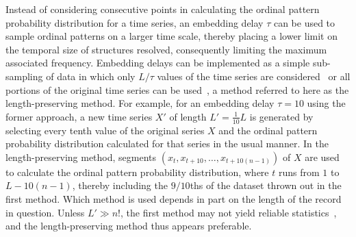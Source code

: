 \documentclass[aps,prx,twocolumn,secnumarabic,nobalancelastpage,amsmath,amssymb,
nofootinbib]{revtex4-1}
\begin{document}
Instead of considering consecutive points in calculating the ordinal pattern probability distribution for a time series, an embedding delay $\tau$ can be used to sample ordinal patterns on a larger time scale, thereby placing a lower limit on the temporal size of structures resolved, consequently limiting the maximum associated frequency. Embedding delays can be implemented as a simple sub-sampling of data in which only $L/\tau$ values of the time series are considered~\cite{maggs2013,gekelman2014} or all portions of the original time series can be used~\cite{bandt2005}, a method referred to here as the length-preserving method. For example, for an embedding delay $\tau=10$ using the former approach, a new time series $X'$ of length $L'=\frac{1}{10}L$ is generated by selecting every tenth value of the original series $X$ and the ordinal pattern probability distribution calculated for that series in the usual manner. In the length-preserving method, segments $ ( x_t,x_{t+10},\ldots,x_{t+10(n-1)} ) $ of $X$ are used to calculate the ordinal pattern probability distribution, where $t$ runs from $1$ to $L-10(n-1)$, thereby including the $9/10$ths of the dataset thrown out in the first method. Which method is used depends in part on the length of the record in question. Unless $L' \gg n!$, the first method may not yield reliable statistics~\cite{gekelman2014}, and the length-preserving method thus appears preferable.
\end{document}
